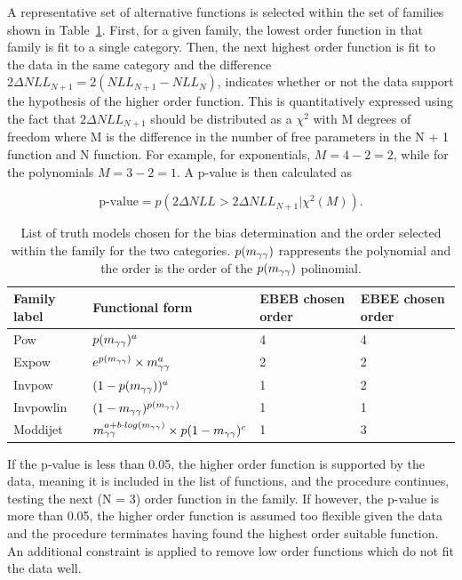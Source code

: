 A representative set of alternative functions is selected within the set of families shown in Table~\ref{tab:bias_func}.
First, for a given family, the lowest order function in that family is fit to a single category. Then, the next highest order function is fit to the data in the same category and the difference $2 \Delta NLL_{N+1} = 2(NLL_{N+1} - NLL_{N})$, indicates whether or not the data support the hypothesis of the higher order function. This is quantitatively expressed using the fact that $ 2 \Delta NLL_{N+1}$ should be distributed as a $\chi^2$ with M degrees of freedom where M is the difference in the number of free parameters in the N + 1 function and N function. For example, for exponentials, $M = 4 - 2 = 2$, while for the polynomials $M = 3 - 2 = 1$. A p-value is then calculated as

$$ \text{p-value} = p(2 \Delta NLL > 2 \Delta NLL_{N+1}| \chi^2(M)). $$

\begin{table}[hbt]
\centering
\begin{tabular}{l|l||l|l}
    Family label & Functional form & EBEB chosen order & EBEE chosen order \\
    \hline
    Pow       &  $p(m_{\gamma\gamma})^a$                 &  4  &  4 \\
    Expow     &  $e^{p(m_{\gamma\gamma})}\times m_{\gamma\gamma}^a$  &  2  &  2 \\
    Invpow    &  $(1-p(m_{\gamma\gamma}))^a$             &  1  &  2 \\
    Invpowlin &  $(1-m_{\gamma\gamma})^{p(m_{\gamma\gamma})}$        &  1  &  1 \\
    Moddijet  &  $m_{\gamma\gamma}^{a+b\cdot log(m_{\gamma\gamma})} \times p(1-m_{\gamma\gamma})^c$ & 1 & 3 \\ 
\end{tabular}
\caption{
  List of truth models chosen for the bias determination and the order selected within the family for the two categories.
  $p(m_{\gamma\gamma})$ rappresents the polynomial and the order is the order of the $p(m_{\gamma\gamma})$ polinomial.
  \label{tab:bias_func}
}
\end{table}

If the p-value is less than 0.05, the higher order function is supported by the data, meaning it is included in the list of functions, and the procedure continues, testing the next (N = 3) order function in the family. If however, the p-value is more than 0.05, the higher order function is
assumed too flexible given the data and the procedure terminates having found the highest order suitable function. An additional constraint is applied to remove low order functions which do not fit the data well. %

